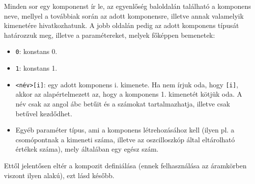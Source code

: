 Minden sor egy komponenst ír le, az egyenlőség baloldalán található a komponens neve, mellyel a továbbiak során az adott komponensre, illetve annak valamelyik kimenetére hivatkozhatunk. A jobb oldalán pedig az adott komponens típusát határozzuk meg, illetve a paramétereket, melyek főképpen bemenetek:
\begin{itemize}
	\item \texttt{0}: konstans 0.
	\item \texttt{1}: konstans 1.
	\item \texttt{<név>[i]}: egy adott komponens i. kimenete. Ha nem írjuk oda, hogy \texttt{[i]}, akkor az alapértelmezett az, hogy a komponens 1. kimenetét kötjük oda. A név csak az angol ábc betűit és a számokat tartalmazhatja, illetve csak betűvel kezdődhet.
	\item Egyéb paraméter típus, ami a komponens létrehozásához kell (ilyen pl. a csomópontnak a kimeneti száma, illetve az oszcilloszkóp által eltárolható értékek száma), mely általában egy egész szám.
\end{itemize}
Ettől jelentősen eltér a kompozit definiálása (ennek felhasználása az áramkörben viszont ilyen alakú), ezt lásd később.

